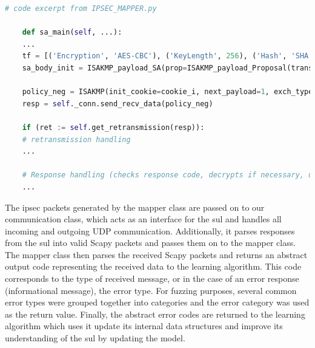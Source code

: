 \begin{lstlisting}[float=h, caption=Excerpt of sa\_main method code, label=lst:mapper1, language=python]
	# code excerpt from IPSEC_MAPPER.py
	
	def sa_main(self, ...):
	...
	tf = [('Encryption', 'AES-CBC'), ('KeyLength', 256), ('Hash', 'SHA'), ('GroupDesc', '1024MODPgr'), ('Authentication', 'PSK'), ('LifeDuration', 28800)]
	sa_body_init = ISAKMP_payload_SA(prop=ISAKMP_payload_Proposal(trans_nb=1, trans=ISAKMP_payload_Transform(num=1, transforms=tf)))
	
	policy_neg = ISAKMP(init_cookie=cookie_i, next_payload=1, exch_type=2)/sa_body_init
	resp = self._conn.send_recv_data(policy_neg)
	
	if (ret := self.get_retransmission(resp)): 
	# retransmission handling
	...
	
	# Response handling (checks response code, decrypts if necessary, updates relevant local values)
	...
\end{lstlisting}

The \ac{ipsec} packets generated by the mapper class are passed on to our communication class, which acts as an interface for the \ac{sul} and handles all incoming and outgoing UDP communication. Additionally, it parses responses from the \ac{sul} into valid Scapy packets and passes them on to the mapper class. The mapper class then parses the received Scapy packets and returns an abstract output code representing the received data to the learning algorithm. This code corresponds to the type of received message, or in the case of an error response (informational message), the error type. For fuzzing purposes, several common error types were grouped together into categories and the error category was used as the return value. Finally, the abstract error codes are returned to the learning algorithm which uses it update its internal data structures and improve its understanding of the \ac{sul} by updating the model. \\

